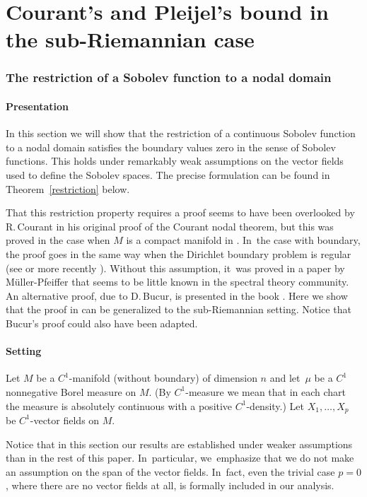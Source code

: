 \documentclass[11pt]{article}
\theoremstyle{definition}
\newcommand{\1}{\mathbbm{1}}
\numberwithin{equation}{section}
\begin{document}
\part{Courant's and Pleijel's bound in the sub-Riemannian case}

\section{The restriction of a Sobolev function to a nodal domain}\label{srest}

\subsection{Presentation}
In this section we will show that the restriction of a continuous Sobolev function to a nodal domain satisfies the boundary values zero in the sense of Sobolev functions. This holds under remarkably weak assumptions on the vector fields used to define the Sobolev spaces. The precise formulation can be found in Theorem~\ref{restriction} below.

That this restriction property requires a proof seems to have been overlooked by R.\,Courant in his original proof of the Courant nodal theorem, but this was proved in the case when $M$ is a compact manifold in \cite{BerMe}. In~the case with boundary, the proof goes in the same way when the Dirichlet boundary problem is regular (see \cite{An} or more recently \cite{LMP}). Without this assumption, it~was proved in a paper by Müller-Pfeiffer \cite{MP} that seems to be little known in the spectral theory community. An alternative proof, due to D.\,Bucur, is presented in the book \cite{LMP}. Here we show that the proof in \cite{MP} can be generalized to the sub-Riemannian setting. Notice that Bucur's proof could also have been adapted.

\subsection{Setting}\label{ss2.2}
Let $M$ be a $C^1$-manifold (without boundary) of dimension $n$ and let~$\mu$ be a $C^1$ nonnegative Borel measure on $M$. (By $C^1$-measure we mean that in each chart the measure is absolutely continuous with a positive $C^1$-density.) Let $X_1,\ldots,X_p$ be $C^1$-vector fields on $M$.

Notice that in this section our results are established under weaker assumptions than in the rest of this paper. In~particular, we~emphasize that we do not make an assumption on the span of the vector fields. In~fact, even the trivial case $p=0$, where there are no vector fields at all, is formally included in our analysis.
\end{document}
